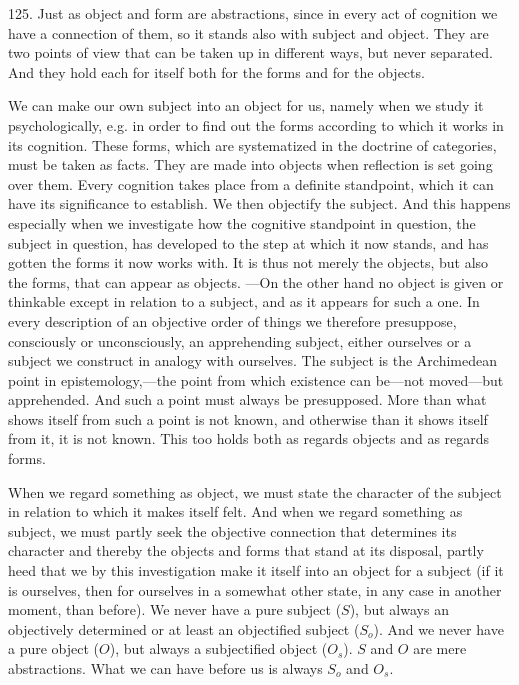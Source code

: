 \documentclass[12pt,a4paper]{book}
\newcommand{\opage}[1]{\marginnote{\footnotesize\textit{[#1]}}}
\begin{document}
125. Just as object and form are abstractions, since in every act of cognition we have
a connection of them, so it stands also with subject and object. They are two points of
view that can be taken up in different ways, but never separated. And they hold each for
itself both for the forms and for the objects.

We can make our own subject into an object for us, namely when we study it
psychologically, e.g. in order to find out the forms according to which it works in its
cognition. These forms, which are systematized in the doctrine of categories, must be taken as
facts. They are made into objects when reflection is set going over them. Every
cognition takes place from a definite standpoint, which it can have its significance to
establish. We then objectify the subject. And this happens especially when we
investigate how the cognitive standpoint in question, the subject in question, has
developed to the step at which it now stands, and has gotten the forms it now works
with. It is thus not merely the objects, but also the forms, that can appear as objects.
---On the other hand no object is given or thinkable except in relation to a subject, and
as it appears for such a one. In every description of an objective order of things we
therefore presuppose, consciously or unconsciously, an apprehending subject, either
ourselves or a subject we construct in analogy with ourselves. The subject is the
Archimedean point in epistemology,---the point from which existence can be---not
moved---but apprehended. And such a point must always be presupposed. More than what
shows itself from such a point is not known, and otherwise than it shows itself from it,
it is not known. This too holds both as regards objects and as regards forms.

\opage{298}When we regard something as object, we must state the character of the subject in
relation to which it makes itself felt. And when we regard something as subject, we must
partly seek the objective connection that determines its character and thereby the
objects and forms that stand at its disposal, partly heed that we by this investigation
make it itself into an object for a subject (if it is ourselves, then for ourselves in a
somewhat other state, in any case in another moment, than before). We never have a pure
subject ($S$), but always an objectively determined or at least an objectified subject
($S_o$). And we never have a pure object ($O$), but always a subjectified object
($O_s$). $S$ and $O$ are mere abstractions. What we can have before us is always $S_o$
and $O_s$.
\end{document}
